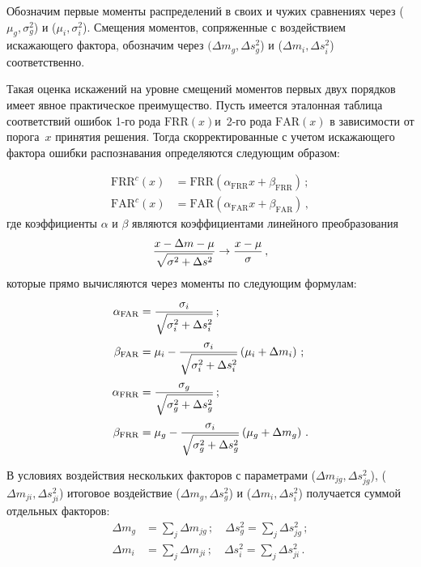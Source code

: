 \begin{multicols}{2}
     Обозначим первые моменты распределений в своих и чужих сравнениях через 
($\mu_g,\sigma_g^2$) и ($\mu_i,\sigma_i^2$). Смещения моментов, сопряженные с 
воздействием искажающего фактора, обозначим через $(\Delta m_g, \Delta s_g^2$) и 
($\Delta m_i, \Delta s_i^2$) соответственно.
     
     Такая оценка искажений на уровне смещений моментов первых двух порядков 
имеет явное практическое преимущество. Пусть имеется эталонная таблица 
соответствий ошибок 1-го рода $\mathrm{FRR}(x)$\linebreak и~2-го рода $\mathrm{FAR} (x)$ в 
зависимости от порога~$x$ принятия решения. Тогда скорректированные с учетом 
искажающего фактора ошибки распознавания определяются следующим образом:

\noindent
     \begin{align*}
     \mathrm{FRR}^c (x) & = \mathrm{FRR}\left ( \alpha_{\mathrm{FRR}} x 
+\beta_{\mathrm{FRR}}\right )\,;\\
     \mathrm{FAR}^c(x) & = \mathrm{FAR}\left ( \alpha_{\mathrm{FAR}} 
x+\beta_{\mathrm{FAR}}\right )\,,
     \end{align*}
где коэффициенты $\alpha$ и $\beta$ являются коэффициентами линейного 
преобразования 
$$
\displaystyle\frac{\displaystyle x-\Delta m -\mu\mathstrut}{\displaystyle \sqrt{\sigma^2+\Delta s^2}\mathstrut} \rightarrow \displaystyle\frac{\displaystyle x-\mu\mathstrut}{\displaystyle \sigma\mathstrut}\,,
$$
которые прямо вычисляются через моменты по следующим формулам:
\begin{align*}
\alpha_{\mathrm{FAR}} & = \displaystyle\frac{\displaystyle \sigma_i\mathstrut}{\displaystyle \sqrt{\sigma_i^2+\Delta s_i^2}\mathstrut}\,;\\
\beta_{\mathrm{FAR}} & = \mu_i -\displaystyle\frac{\displaystyle \sigma_i\mathstrut}{\displaystyle \sqrt{\sigma_i^2+\Delta s_i^2}\mathstrut}\left ( 
\mu_i+\Delta m_i\right )\,;\\
\alpha_{\mathrm{FRR}} & = \displaystyle\frac{\displaystyle \sigma_g\mathstrut}{\displaystyle \sqrt{\sigma_g^2+\Delta s_g^2}\mathstrut}\,;\\
\beta_{\mathrm{FRR}}& = \mu_g -\displaystyle\frac{\displaystyle \sigma_i\mathstrut}{\displaystyle \sqrt{\sigma_g^2+\Delta s_g^2}\mathstrut}\left ( 
\mu_g+\Delta m_g\right )\,.
\end{align*}



     В условиях воздействия нескольких факторов с параметрами ($\Delta m_{jg}, 
\Delta s_{jg}^2$), ($\Delta m_{ji}, \Delta s_{ji}^2$) итоговое воздействие ($\Delta m_g, 
\Delta s_g^2$) и ($\Delta m_i, \Delta s_i^2$) получается суммой отдельных факторов:
     \begin{align*}
     \Delta m_g & = \sum\limits_j \Delta m_{jg}\,;\quad \Delta s_g^2 = \sum\limits_j \Delta 
s_{jg}^2\,;\\
     \Delta m_i & = \sum\limits_j \Delta m_{ji}\,;\quad \Delta s_i^2 = \sum\limits_j \Delta 
s_{ji}^2\,.
     \end{align*}
     

\end{multicols}
